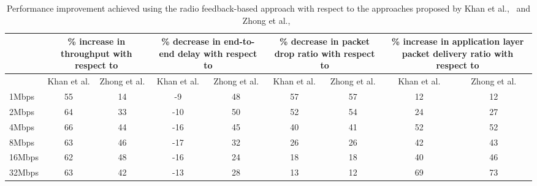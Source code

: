 \begin{table}[!htb]
	\centering
    \caption{Performance improvement achieved using the radio feedback-based approach with respect to the approaches proposed by Khan et al.,~\cite{khan2015towards} and Zhong et al.,~\cite{zhong2014capacity}}
  \label{tab:topology4RadioImprovement}
  \renewcommand\multirowsetup{\centering}
    \begin{tabular}{|>{\centering} p{}|c|c|c|c|c|c|c|c|}
    \hline
    \multirow{2}{0.12\textwidth}{\newline \newline \newline Application data rate} & \multicolumn{2}{|p{0.12\textwidth}|}{\centering\% increase in throughput with respect to} & \multicolumn{2}{|p{0.12\textwidth}|}{\centering\% decrease in end-to-end delay with respect to} & \multicolumn{2}{|p{0.12\textwidth}|}{\centering\% decrease in packet drop ratio with respect to} & \multicolumn{2}{|p{0.16\textwidth}|}{\centering\% increase in application layer packet delivery ratio with respect to}\\
    \cline{2-9}
          & \multicolumn{1}{|p{0.06\textwidth}|}{\centering Khan et al.} & \multicolumn{1}{|p{0.06\textwidth}|}{\centering Zhong et al.} & \multicolumn{1}{|p{0.06\textwidth}|}{\centering Khan et al.} & \multicolumn{1}{|p{0.06\textwidth}|}{\centering Zhong et al.} & \multicolumn{1}{|p{0.06\textwidth}|}{\centering Khan et al.} & \multicolumn{1}{|p{0.06\textwidth}|}{\centering Zhong et al.} & \multicolumn{1}{|p{0.08\textwidth}|}{\centering Khan et al.} & \multicolumn{1}{|p{0.08\textwidth}|}{\centering Zhong et al.}\\
    \hline
    1Mbps & 55 & 14 & -9 & 48 & 57 & 57 & 12 & 12 \\\hline
    2Mbps & 64 & 33 & -10 & 50 & 52 & 54 & 24 & 27 \\\hline
    4Mbps & 66 & 44 & -16 & 45 & 40 & 41 & 52 & 52 \\\hline
    8Mbps & 63 & 46 & -17 & 32 & 26 & 26 & 42 & 43 \\\hline
    16Mbps & 62 & 48 & -16 & 24 & 18 & 18 & 40 & 46 \\\hline
    32Mbps & 63 & 42 & -13 & 28 & 13 & 12 & 69 & 73 \\\hline
    \end{tabular}%
\end{table}

